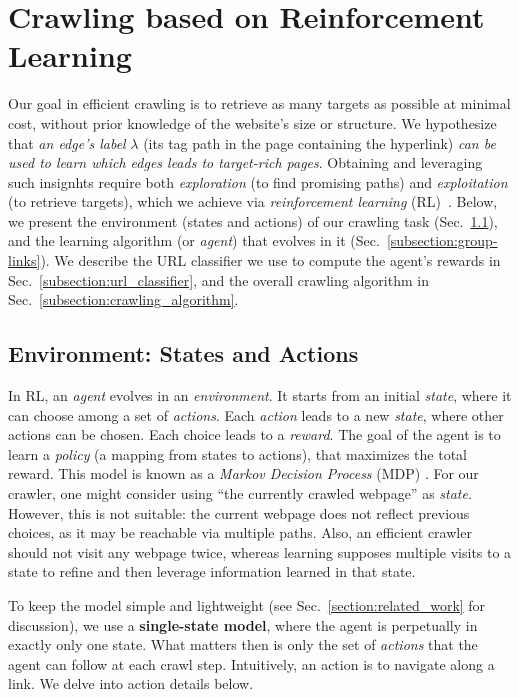 \section{Crawling based on Reinforcement Learning}\label{section:solution}

Our goal in efficient crawling is to retrieve as many targets as possible at minimal cost, without prior knowledge of the website's size or structure. We hypothesize that \emph{an edge's label} $\lambda$ (its tag path in the page containing the hyperlink) \emph{can be used to learn which edges leads to target-rich pages}. Obtaining and leveraging such insignhts require both \emph{exploration} (to find promising paths) and \emph{exploitation} (to retrieve targets), which we achieve via \emph{reinforcement learning} (RL)~\cite{sutton2018reinforcement}. 
Below, we present the environment (states and actions) of our crawling task (Sec.~\ref{subsection:states_actions}), and the learning algorithm (or \emph{ agent}) that evolves in it (Sec.~\ref{subsection:group-links}).
We describe the URL classifier we use to compute the agent's rewards in 
Sec.~\ref{subsection:url_classifier}, and the overall crawling algorithm in Sec.~\ref{subsection:crawling_algorithm}.


\subsection{Environment: States and Actions}\label{subsection:states_actions}

In RL, an \emph{agent} evolves in an \emph{environment}. It starts from an initial \emph{state}, where it can choose among a set of \emph{actions}. Each \emph{action} leads to a new \emph{state}, where other actions can be chosen. Each choice leads to a \emph{reward}. The  goal of the agent is to learn a \emph{policy} (a mapping from states to actions), that maximizes the total reward. This model is known as a \emph{Markov Decision Process} (MDP) \cite{howard1960dynamic}.
For our crawler, one might consider using ``the currently crawled webpage'' as \emph{state}. However, this is not suitable: the current webpage does not reflect previous choices, as it may be reachable via multiple paths. Also, an efficient crawler should not visit any webpage twice, whereas learning supposes multiple visits to a state to refine and then leverage information learned in that state.

To keep the model simple and lightweight (see Sec.~\ref{section:related_work} for discussion), we use a \textbf{single-state model}, where the agent is perpetually in exactly only one state. What matters then is only the set of \emph{actions} that the agent can follow at each crawl step. Intuitively, an action is to navigate along a link. We delve into action details below.


